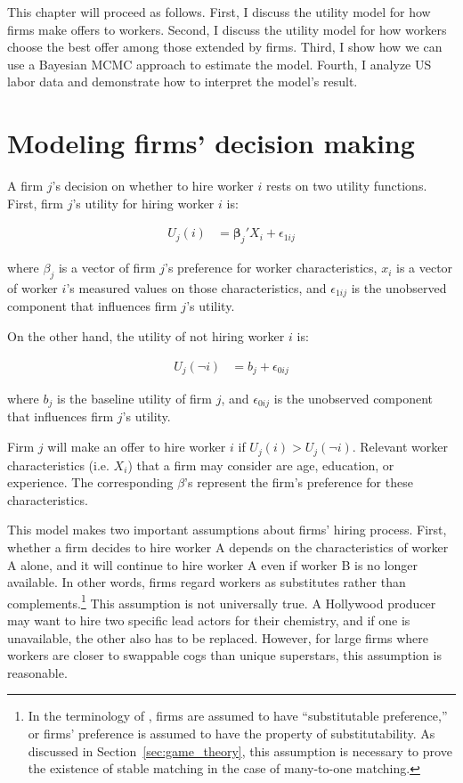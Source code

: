 This chapter will proceed as follows. First, I discuss the utility model for how
firms make offers to workers. Second, I discuss the utility model for how
workers choose the best offer among those extended by firms. Third, I show how
we can use a Bayesian MCMC
approach to estimate the model. Fourth, I analyze US labor data and demonstrate how to
interpret the model's result.

\section{Modeling firms' decision making}

A firm $j$'s decision on whether to hire worker $i$ rests on two utility
functions. First, firm $j$'s utility for hiring worker $i$ is:

\begin{align}
  U_j(i) &= \bm{\beta}_j' X_i + \epsilon_{1ij}
\end{align}

where $\beta_j$ is a vector of firm $j$'s preference for worker characteristics,
$x_i$ is a vector of worker $i$'s measured values on those characteristics, and
$\epsilon_{1ij}$ is the unobserved component that influences firm $j$'s utility.

On the other hand, the utility of not hiring worker $i$ is:

\begin{align}
  U_j(\neg i) &= b_j + \epsilon_{0ij}
\end{align}

where $b_j$ is the baseline utility of firm $j$, and $\epsilon_{0ij}$ is the
unobserved component that influences firm $j$'s utility.

Firm $j$ will make an offer to hire worker $i$ if $U_j(i) > U_j(\neg i)$.
Relevant worker characteristics (i.e. $X_i$) that a firm may consider are age,
education, or experience. The corresponding $\beta$'s represent the firm's
preference for these characteristics.

This model makes two important assumptions about firms' hiring process. First,
whether a firm decides to hire worker A depends on the characteristics of worker
A alone, and it will continue to hire worker A even if worker B is no longer
available. In other words, firms regard workers as substitutes rather than
complements.\footnote{In the terminology of \citet{Roth1992}, firms are assumed
  to have ``substitutable preference,'' or firms' preference is assumed to have
  the property of substitutability. As discussed in
  Section~\ref{sec:game_theory}, this assumption is necessary to prove the
  existence of stable matching in the case of many-to-one matching.} This
assumption is not universally true. A Hollywood producer may want to hire two
specific lead actors for their chemistry, and if one is unavailable, the other
also has to be replaced. However, for large firms where workers are closer to
swappable cogs than unique superstars, this assumption is reasonable.

